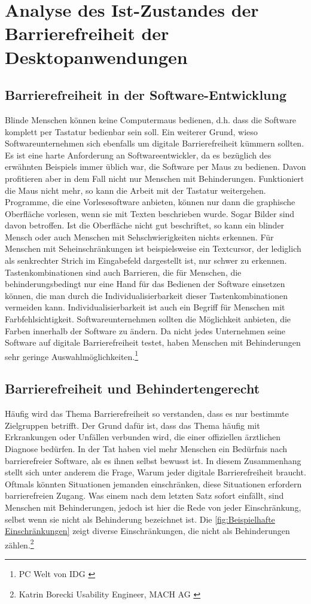 \section{Analyse des Ist-Zustandes der Barrierefreiheit der Desktopanwendungen}

\subsection{Barrierefreiheit in der Software-Entwicklung}
Blinde Menschen können keine Computermaus bedienen, d.h. dass die Software komplett per Tastatur bedienbar sein soll. Ein weiterer Grund, wieso Softwareunternehmen sich ebenfalls um digitale Barrierefreiheit kümmern sollten. Es ist eine harte Anforderung an Softwareentwickler, da es bezüglich des erwähnten Beispiels immer üblich war, die Software per Maus zu bedienen. Davon profitieren aber in dem Fall nicht nur Menschen mit Behinderungen. Funktioniert die Maus nicht mehr, so kann die Arbeit mit der Tastatur weitergehen. Programme, die eine Vorlesesoftware anbieten, können nur dann die graphische Oberfläche vorlesen, wenn sie mit Texten beschrieben wurde. Sogar Bilder sind davon betroffen. Ist die Oberfläche nicht gut beschriftet, so kann ein blinder Mensch oder auch Menschen mit Sehschwierigkeiten nichts erkennen. Für Menschen mit Seheinschränkungen ist beispielsweise ein Textcursor, der lediglich als senkrechter Strich im Eingabefeld dargestellt ist, nur schwer zu erkennen. Tastenkombinationen sind auch Barrieren, die für Menschen, die behinderungsbedingt nur eine Hand für das Bedienen der Software einsetzen können, die man durch die Individualisierbarkeit dieser Tastenkombinationen vermeiden kann. Individualisierbarkeit ist auch ein Begriff für Menschen mit Farbfehlsichtigkeit. Softwareunternehmen sollten die Möglichkeit anbieten, die Farben innerhalb der Software zu ändern. Da nicht jedes Unternehmen seine Software auf digitale Barrierefreiheit testet, haben Menschen mit Behinderungen sehr geringe Auswahlmöglichkeiten.\footnote{PC Welt von IDG \cite{PcWelt}}

\subsection{Barrierefreiheit und Behindertengerecht}
\label{subsec:Barrierefreiheit und Behindertengerecht}
Häufig wird das Thema Barrierefreiheit so verstanden, dass es nur bestimmte Zielgruppen betrifft. Der Grund dafür ist, dass das Thema häufig mit Erkrankungen oder Unfällen verbunden wird, die einer offiziellen ärztlichen Diagnose bedürfen. In der Tat haben viel mehr Menschen ein Bedürfnis nach barrierefreier Software, als es ihnen selbst bewusst ist. In diesem Zusammenhang stellt sich unter anderem die Frage, Warum jeder digitale Barrierefreiheit braucht. Oftmals könnten Situationen jemanden einschränken, diese Situationen erfordern barrierefreien Zugang. Was einem nach dem letzten Satz sofort einfällt, sind Menschen mit Behinderungen, jedoch ist hier die Rede von jeder Einschränkung, selbst wenn sie nicht als Behinderung bezeichnet ist. Die \cref{fig:Beispielhafte Einschränkungen} zeigt diverse Einschränkungen, die nicht als Behinderungen zählen.\footnote{Katrin Borecki Usability Engineer, MACH AG \cite{mach}}

